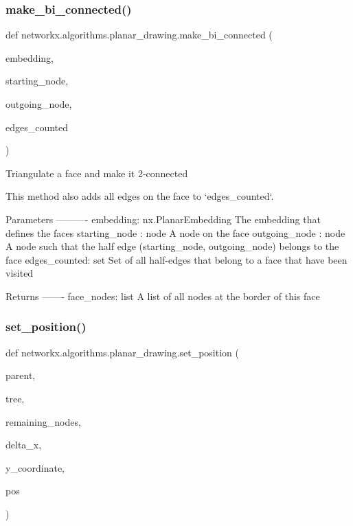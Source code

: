 \subsubsection{\texorpdfstring{make\+\_\+bi\+\_\+connected()}{make\_bi\_connected()}}
{\footnotesize\ttfamily def networkx.\+algorithms.\+planar\+\_\+drawing.\+make\+\_\+bi\+\_\+connected (\begin{DoxyParamCaption}\item[{}]{embedding,  }\item[{}]{starting\+\_\+node,  }\item[{}]{outgoing\+\_\+node,  }\item[{}]{edges\+\_\+counted }\end{DoxyParamCaption})}

\begin{DoxyVerb}Triangulate a face and make it 2-connected

This method also adds all edges on the face to `edges_counted`.

Parameters
----------
embedding: nx.PlanarEmbedding
    The embedding that defines the faces
starting_node : node
    A node on the face
outgoing_node : node
    A node such that the half edge (starting_node, outgoing_node) belongs
    to the face
edges_counted: set
    Set of all half-edges that belong to a face that have been visited

Returns
-------
face_nodes: list
    A list of all nodes at the border of this face
\end{DoxyVerb}
 \mbox{\label{namespacenetworkx_1_1algorithms_1_1planar__drawing_a982f71be29109cd0fdaa238cf0551a23}} 
\subsubsection{\texorpdfstring{set\+\_\+position()}{set\_position()}}
{\footnotesize\ttfamily def networkx.\+algorithms.\+planar\+\_\+drawing.\+set\+\_\+position (\begin{DoxyParamCaption}\item[{}]{parent,  }\item[{}]{tree,  }\item[{}]{remaining\+\_\+nodes,  }\item[{}]{delta\+\_\+x,  }\item[{}]{y\+\_\+coordinate,  }\item[{}]{pos }\end{DoxyParamCaption})}


